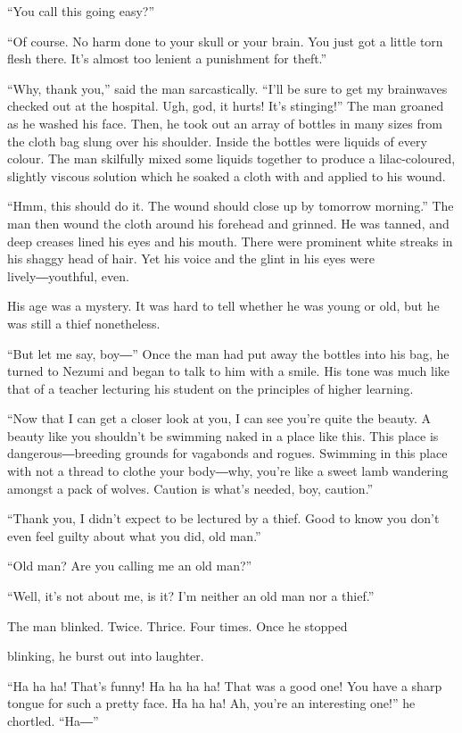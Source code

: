 ``You call this going easy?''

``Of course. No harm done to your skull or your brain. You just got a
little torn flesh there. It's almost too lenient a punishment for
theft.''

``Why, thank you,'' said the man sarcastically. ``I'll be sure to get my
brainwaves checked out at the hospital. Ugh, god, it hurts! It's
stinging!'' The man groaned as he washed his face. Then, he took out an
array of bottles in many sizes from the cloth bag slung over his
shoulder. Inside the bottles were liquids of every colour. The man
skilfully mixed some liquids together to produce a lilac-coloured,
slightly viscous solution which he soaked a cloth with and applied to
his wound.

``Hmm, this should do it. The wound should close up by tomorrow
morning.'' The man then wound the cloth around his forehead and grinned.
He was tanned, and deep creases lined his eyes and his mouth. There were
prominent white streaks in his shaggy head of hair. Yet his voice and
the glint in his eyes were lively―youthful, even.

His age was a mystery. It was hard to tell whether he was young or old,
but he was still a thief nonetheless.

``But let me say, boy―'' Once the man had put away the bottles into his
bag, he turned to Nezumi and began to talk to him with a smile. His tone
was much like that of a teacher lecturing his student on the principles
of higher learning.

``Now that I can get a closer look at you, I can see you're quite the
beauty. A beauty like you shouldn't be swimming naked in a place like
this. This place is dangerous―breeding grounds for vagabonds and rogues.
Swimming in this place with not a thread to clothe your body―why, you're
like a sweet lamb wandering amongst a pack of wolves. Caution is what's
needed, boy, caution.''

``Thank you, I didn't expect to be lectured by a thief. Good to know you
don't even feel guilty about what you did, old man.''

``Old man? Are you calling me an old man?''

``Well, it's not about me, is it? I'm neither an old man nor a thief.''

The man blinked. Twice. Thrice. Four times. Once he stopped~

blinking, he burst out into laughter.

``Ha ha ha! That's funny! Ha ha ha ha! That was a good one! You have a
sharp tongue for such a pretty face. Ha ha ha! Ah, you're an interesting
one!'' he chortled. ``Ha―''

